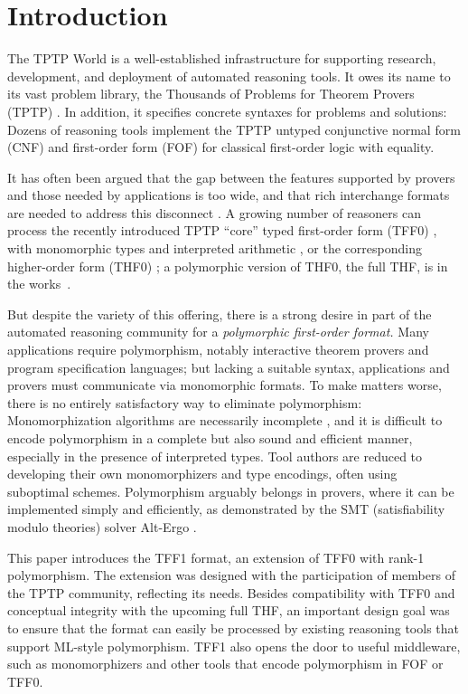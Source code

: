 \section{Introduction}
\label{sec_intro}

The TPTP World \cite{sutcliffe-2010-world} is a well-established infrastructure
for supporting research, development, and deployment of automated reasoning
tools. It owes its name to its vast problem library, the Thousands of Problems for Theorem
Provers (TPTP) \cite{sutcliffe-2009-lib}. In addition, it specifies concrete
syntaxes for problems and solutions:
Dozens of reasoning tools implement the TPTP untyped conjunctive normal form
(CNF) and first-order form (FOF) for classical
first-order logic with equality.

It has often been argued that the gap between the features supported by provers
and those needed by applications is too wide, and that rich interchange formats
are needed to address this disconnect
\cite{schumann-2001,voronkov-2003,mccune-2003,stickel-2009,kuncak-2011}.
A growing number of reasoners can process the
recently introduced TPTP ``core'' typed first-order form (TFF0) \cite{sutcliffe-et-al-2012-tff0},
with monomorphic types and interpreted arithmetic \cite{SPASS-T,vampire-arith},
or the corresponding higher-order form (THF0) \cite{benzmueller-et-al-2008-thf0};
a polymorphic version of THF0, the full THF, is in the works~\cite{sutcliffe-benzmueller-2010}.

But despite the variety of this offering, there is a strong desire in part of the automated
reasoning community for a \emph{polymorphic first-order format.} Many applications
require polymorphism, notably interactive theorem provers and program
specification languages; but lacking a suitable syntax, applications
and provers must communicate via monomorphic formats. To make matters worse, there is no entirely
satisfactory way to eliminate polymorphism: Monomorphization algorithms are %
necessarily incomplete \cite[\S2]{bobot-paskevich-2011},
and it is difficult to encode polymorphism in a complete but
also sound and efficient manner, especially in the presence of interpreted types. Tool authors
are reduced to developing their own monomorphizers and type encodings, often
using suboptimal schemes. Polymorphism arguably belongs in
provers, where it can be implemented simply and efficiently, as demonstrated by
the SMT (satisfiability modulo theories) solver Alt-Ergo \cite{bobot-et-al-2008}.

This paper introduces the TFF1
format, an extension of TFF0 with rank-1 polymorphism. The
extension was designed with the participation of members of the TPTP community,
reflecting its needs.
Besides compatibility with TFF0 and conceptual integrity with the upcoming full
THF, an important design goal was to ensure that the format can easily be
processed by existing reasoning tools that support ML-style polymorphism. TFF1
also opens the door to useful middleware, such as monomorphizers and other
tools that encode polymorphism in FOF or TFF0.

